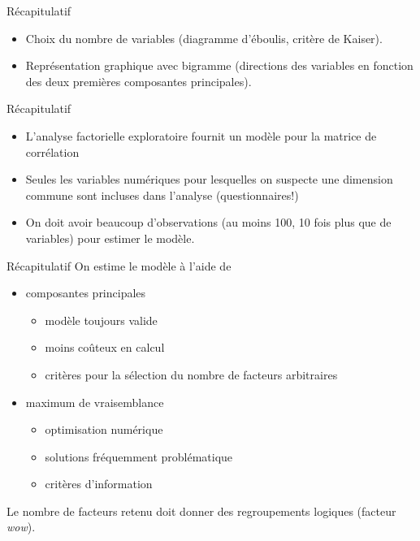 \documentclass[
  ignorenonframetext,
]{beamer}
\providecommand{\tightlist}{%
  \setlength{\itemsep}{0pt}\setlength{\parskip}{0pt}}\usepackage{longtable,booktabs,array}
\begin{document}
\begin{frame}{Récapitulatif}
\protect\hypertarget{ruxe9capitulatif}{}
\begin{itemize}
\tightlist
\item
  Choix du nombre de variables (diagramme d'éboulis, critère de Kaiser).
\item
  Représentation graphique avec bigramme (directions des variables en
  fonction des deux premières composantes principales).
\end{itemize}
\end{frame}

\begin{frame}{Récapitulatif}
\protect\hypertarget{ruxe9capitulatif-1}{}
\begin{itemize}
\tightlist
\item
  L'analyse factorielle exploratoire fournit un modèle pour la matrice
  de corrélation
\item
  Seules les variables numériques pour lesquelles on suspecte une
  dimension commune sont incluses dans l'analyse (questionnaires!)
\item
  On doit avoir beaucoup d'observations (au moins 100, 10 fois plus que
  de variables) pour estimer le modèle.
\end{itemize}
\end{frame}

\begin{frame}{Récapitulatif}
\protect\hypertarget{ruxe9capitulatif-2}{}
On estime le modèle à l'aide de

\begin{itemize}
\tightlist
\item
  composantes principales

  \begin{itemize}
  \tightlist
  \item
    modèle toujours valide
  \item
    moins coûteux en calcul
  \item
    critères pour la sélection du nombre de facteurs arbitraires
  \end{itemize}
\item
  maximum de vraisemblance

  \begin{itemize}
  \tightlist
  \item
    optimisation numérique
  \item
    solutions fréquemment problématique
  \item
    critères d'information
  \end{itemize}
\end{itemize}

Le nombre de facteurs retenu doit donner des regroupements logiques
(facteur \emph{wow}).
\end{frame}
\end{document}
